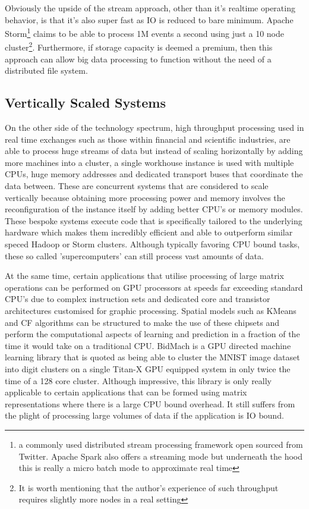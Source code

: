 \documentclass[a4paper,11pt]{scrreprt}
\begin{document}
Obviously the upside of the stream approach, other than it's realtime operating behavior, is that it's also super fast as IO is reduced to bare minimum. Apache Storm\cite{storm-site}\footnote{a commonly used distributed stream processing framework open sourced from Twitter\cite{storm-twitter}. Apache Spark also offers a streaming mode but underneath the hood this is really a micro batch mode to approximate real time\cite{spark-streaming-paper}} claims to be able to process 1M events a second using just a 10 node cluster\footnote{It is worth mentioning that the author's experience of such throughput requires slightly more nodes in a real setting}. Furthermore, if storage capacity is deemed a premium, then this approach can allow big data processing to function without the need of a distributed file system. 

\subsection{Vertically Scaled Systems}
On the other side of the technology spectrum, high throughput processing used in real time exchanges such as those within financial and scientific industries, are able to process huge streams of data but instead of scaling horizontally by adding more machines into a cluster, a single workhouse instance is used with multiple CPUs, huge memory addresses and dedicated transport buses that coordinate the data between. These are concurrent systems that are considered to scale vertically because obtaining more processing power and memory involves the reconfiguration of the instance itself by adding better CPU's or memory modules. These bespoke systems execute code that is specifically tailored to the underlying hardware which makes them incredibly efficient and able to outperform similar speced Hadoop or Storm clusters. Although typically favoring CPU bound tasks, these so called 'supercomputers' can still process vast amounts of data.

At the same time, certain applications that utilise processing of large matrix operations can be performed on GPU processors at speeds far exceeding standard CPU's due to complex instruction sets and dedicated core and transistor architectures customised for graphic processing. Spatial models such as KMeans and CF algorithms can be structured to make the use of these chipsets and perform the computational aspects of learning and prediction in a fraction of the time it would take on a traditional CPU. BidMach\cite{bidmach} is a GPU directed machine learning library that is quoted as being able to cluster the MNIST image dataset into digit clusters on a single Titan-X GPU equipped system in only twice the time of a 128 core cluster\cite{bidmachbench}. Although impressive, this library is only really applicable to certain applications that can be formed using matrix representations where there is a large CPU bound overhead. It still suffers from the plight of processing large volumes of data if the application is IO bound.
\end{document}
